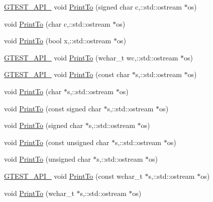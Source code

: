 \begin{DoxyCompactItemize}
\item 
\hyperlink{gtest-port_8h_aa73be6f0ba4a7456180a94904ce17790}{G\+T\+E\+S\+T\+\_\+\+A\+P\+I\+\_\+} void \hyperlink{namespacetesting_1_1internal_aaaa417e593ae34220fa06c7b96f5f1d4}{Print\+To} (signed char c,\+::std\+::ostream $\ast$os)
\item 
void \hyperlink{namespacetesting_1_1internal_ae91b06a9e343f5ddabff85626a7d507a}{Print\+To} (char c,\+::std\+::ostream $\ast$os)
\item 
void \hyperlink{namespacetesting_1_1internal_a832beb8c56070fc5c175b8bfd8bbeba0}{Print\+To} (bool x,\+::std\+::ostream $\ast$os)
\item 
\hyperlink{gtest-port_8h_aa73be6f0ba4a7456180a94904ce17790}{G\+T\+E\+S\+T\+\_\+\+A\+P\+I\+\_\+} void \hyperlink{namespacetesting_1_1internal_a3802453cf4e3f4870f589c69c7b43b2b}{Print\+To} (wchar\+\_\+t wc,\+::std\+::ostream $\ast$os)
\item 
\hyperlink{gtest-port_8h_aa73be6f0ba4a7456180a94904ce17790}{G\+T\+E\+S\+T\+\_\+\+A\+P\+I\+\_\+} void \hyperlink{namespacetesting_1_1internal_afc6dad64c4dd4799036f252c07d8a59f}{Print\+To} (const char $\ast$s,\+::std\+::ostream $\ast$os)
\item 
void \hyperlink{namespacetesting_1_1internal_ae04a499cedbda0b244c216211081a8b6}{Print\+To} (char $\ast$s,\+::std\+::ostream $\ast$os)
\item 
void \hyperlink{namespacetesting_1_1internal_af4616278b2c3ac265ad80481e0ce8da7}{Print\+To} (const signed char $\ast$s,\+::std\+::ostream $\ast$os)
\item 
void \hyperlink{namespacetesting_1_1internal_abac47db29a65b1633028fe8001f57212}{Print\+To} (signed char $\ast$s,\+::std\+::ostream $\ast$os)
\item 
void \hyperlink{namespacetesting_1_1internal_a96409c0b7d8ce520c40a0aa5eb9280b6}{Print\+To} (const unsigned char $\ast$s,\+::std\+::ostream $\ast$os)
\item 
void \hyperlink{namespacetesting_1_1internal_a10f8d85ee591c315557372669c02fbb7}{Print\+To} (unsigned char $\ast$s,\+::std\+::ostream $\ast$os)
\item 
\hyperlink{gtest-port_8h_aa73be6f0ba4a7456180a94904ce17790}{G\+T\+E\+S\+T\+\_\+\+A\+P\+I\+\_\+} void \hyperlink{namespacetesting_1_1internal_a9f0cce661c0cff119402169bb08131fa}{Print\+To} (const wchar\+\_\+t $\ast$s,\+::std\+::ostream $\ast$os)
\item 
void \hyperlink{namespacetesting_1_1internal_a43ae763e7cd5602ebbd9bdc5884203f0}{Print\+To} (wchar\+\_\+t $\ast$s,\+::std\+::ostream $\ast$os)

\end{DoxyCompactItemize}
